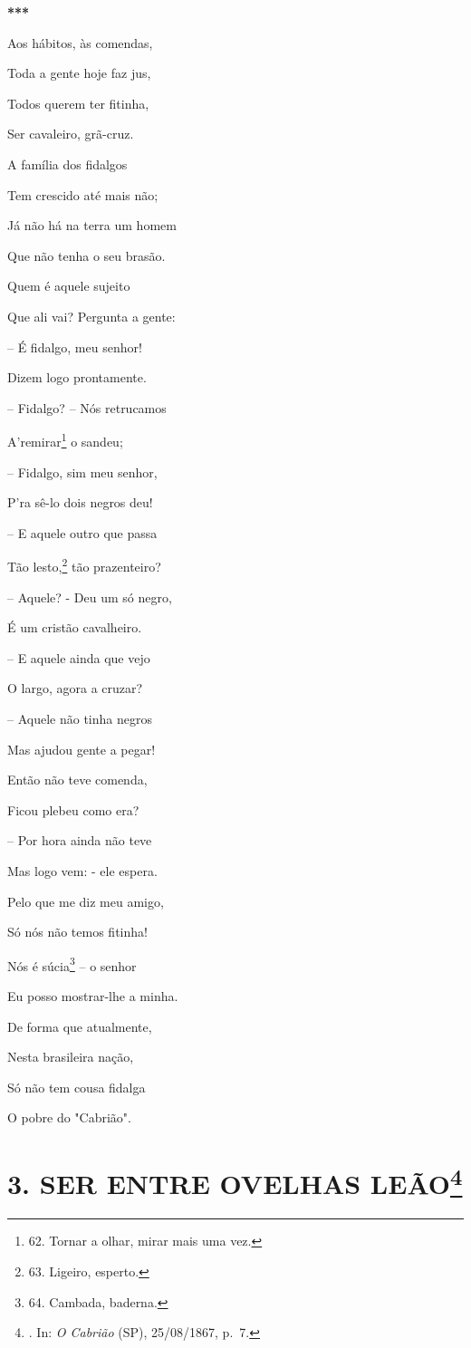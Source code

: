 \textbf{***}

Aos hábitos, às comendas,

Toda a gente hoje faz jus,

Todos querem ter fitinha,

Ser cavaleiro, grã-cruz.

A família dos fidalgos

Tem crescido até mais não;

Já não há na terra um homem

Que não tenha o seu brasão.

Quem é aquele sujeito

Que ali vai? Pergunta a gente:

-- É fidalgo, meu senhor!

Dizem logo prontamente.

-- Fidalgo? -- Nós retrucamos

A'remirar\footnote{62. Tornar a olhar, mirar mais uma vez.} o sandeu;

-- Fidalgo, sim meu senhor,

P'ra sê-lo dois negros deu!

-- E aquele outro que passa

Tão lesto,\footnote{63. Ligeiro, esperto.} tão prazenteiro?

-- Aquele? - Deu um só negro,

É um cristão cavalheiro.

-- E aquele ainda que vejo

O largo, agora a cruzar?

-- Aquele não tinha negros

Mas ajudou gente a pegar!

Então não teve comenda,

Ficou plebeu como era?

-- Por hora ainda não teve

Mas logo vem: - ele espera.

Pelo que me diz meu amigo,

Só nós não temos fitinha!

Nós é súcia\footnote{64. Cambada, baderna.} -- o senhor

Eu posso mostrar-lhe a minha.

De forma que atualmente,

Nesta brasileira nação,

Só não tem cousa fidalga

O pobre do "Cabrião".

\chapter[\textbf{3. SER ENTRE OVELHAS LEÃO}]{\texorpdfstring{\textbf{3.
SER ENTRE OVELHAS LEÃO}\footnote{. In: \emph{O Cabrião} (SP),
  25/08/1867, p.~7.}}{3. SER ENTRE OVELHAS LEÃO}}

